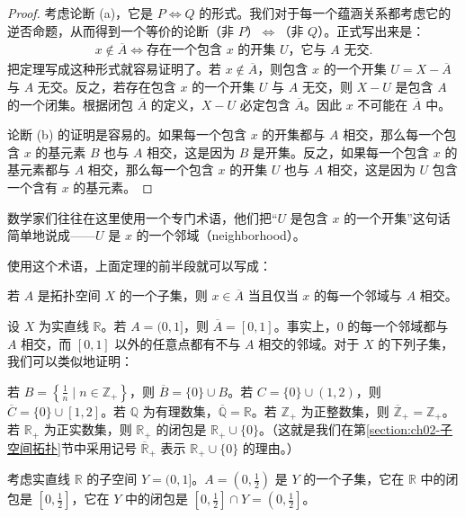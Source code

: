 \documentclass[../../main.tex]{subfiles}
\begin{document}
\begin{proof}
考虑论断 (a)，它是 $P \Leftrightarrow Q$ 的形式。我们对于每一个蕴涵关系都考虑它的逆否命题，从而得到一个等价的论断（非 $P$）$\Leftrightarrow$（非 $Q$）。正式写出来是：
\begin{align*}
x \notin \overline{A} \Longleftrightarrow \text{存在一个包含 } x \text{ 的开集 } U \text{，它与 } A \text{ 无交}.
\end{align*}
把定理写成这种形式就容易证明了。若 $x \notin \overline{A}$，则包含 $x$ 的一个开集 $U = X - \overline{A}$ 与 $A$ 无交。反之，若存在包含 $x$ 的一个开集 $U$ 与 $A$ 无交，则 $X - U$ 是包含 $A$ 的一个闭集。根据闭包 $\overline{A}$ 的定义，$X - U$ 必定包含 $\overline{A}$。因此 $x$ 不可能在 $\overline{A}$ 中。

论断 (b) 的证明是容易的。如果每一个包含 $x$ 的开集都与 $A$ 相交，那么每一个包含 $x$ 的基元素 $B$ 也与 $A$ 相交，这是因为 $B$ 是开集。反之，如果每一个包含 $x$ 的基元素都与 $A$ 相交，那么每一个包含 $x$ 的开集 $U$ 也与 $A$ 相交，这是因为 $U$ 包含一个含有 $x$ 的基元素。
\end{proof}

数学家们往往在这里使用一个专门术语，他们把“$U$ 是包含 $x$ 的一个开集”这句话简单地说成——$U$ 是 $x$ 的一个邻域（neighborhood）。

使用这个术语，上面定理的前半段就可以写成：

若 $A$ 是拓扑空间 $X$ 的一个子集，则 $x \in \overline{A}$ 当且仅当 $x$ 的每一个邻域与 $A$ 相交。

\begin{example}\label{example:ch02-闭包例1}
设 $X$ 为实直线 $\mathbb{R}$。若 $A = (0, 1]$，则 $\overline{A} = [0, 1]$。事实上，0 的每一个邻域都与 $A$ 相交，而 $[0, 1]$ 以外的任意点都有不与 $A$ 相交的邻域。对于 $X$ 的下列子集，我们可以类似地证明：

若 $B = \left\{\frac{1}{n} \mid n \in \mathbb{Z}_{+}\right\}$，则 $\overline{B} = \{0\} \cup B$。若 $C = \{0\} \cup (1, 2)$，则 $\overline{C} = \{0\} \cup [1, 2]$。若 $\mathbb{Q}$ 为有理数集，$\overline{\mathbb{Q}} = \mathbb{R}$。若 $\mathbb{Z}_{+}$ 为正整数集，则 $\overline{\mathbb{Z}}_{+} = \mathbb{Z}_{+}$。若 $\mathbb{R}_{+}$ 为正实数集，则 $\mathbb{R}_{+}$ 的闭包是 $\mathbb{R}_{+} \cup \{0\}$。（这就是我们在第\cref{section:ch02-子空间拓扑}节中采用记号 $\overline{\mathbb{R}}_{+}$ 表示 $\mathbb{R}_{+} \cup \{0\}$ 的理由。）
\end{example}

\begin{example}\label{example:ch02-闭包例2}
考虑实直线 $\mathbb{R}$ 的子空间 $Y = (0, 1]$。$A = \left(0, \frac{1}{2}\right)$ 是 $Y$ 的一个子集，它在 $\mathbb{R}$ 中的闭包是 $\left[0, \frac{1}{2}\right]$，它在 $Y$ 中的闭包是 $\left[0, \frac{1}{2}\right] \cap Y = \left(0, \frac{1}{2}\right]$。
\end{example}
\end{document}
